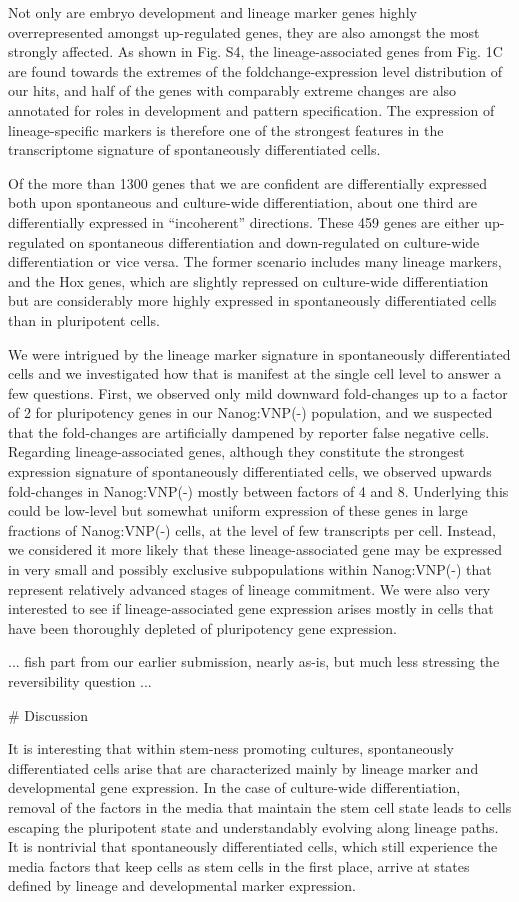 Not only are embryo development and lineage marker genes highly overrepresented amongst up-regulated genes, they are also amongst the most strongly affected. As shown in Fig. S4, the lineage-associated genes from Fig. 1C are found towards the extremes of the foldchange-expression level distribution of our hits, and half of the genes with comparably extreme changes are also annotated for roles in development and pattern specification. The expression of lineage-specific markers is therefore one of the strongest features in the transcriptome signature of spontaneously differentiated cells.

Of the more than 1300 genes that we are confident are differentially expressed both upon spontaneous and culture-wide differentiation, about one third are differentially expressed in ``incoherent'' directions. These 459 genes are either up-regulated on spontaneous differentiation and down-regulated on culture-wide differentiation or vice versa. The former scenario includes many lineage markers, and the Hox genes, which are slightly repressed on culture-wide differentiation but are considerably more highly expressed in spontaneously differentiated cells than in pluripotent cells. 


We were intrigued by the lineage marker signature in spontaneously differentiated cells and we investigated how that is manifest at the single cell level to answer a few questions. First, we observed only mild downward fold-changes up to a factor of 2 for pluripotency genes in our Nanog:VNP(-) population, and we suspected that the fold-changes are artificially dampened by reporter false negative cells.  Regarding lineage-associated genes, although they constitute the  strongest expression signature of spontaneously differentiated cells, we observed upwards fold-changes in Nanog:VNP(-) mostly between factors of 4 and 8. Underlying this could be low-level but somewhat uniform expression of these genes in large fractions of Nanog:VNP(-) cells, at the level of few transcripts per cell. Instead, we considered it more likely that these lineage-associated gene may be expressed in very small and possibly exclusive subpopulations within Nanog:VNP(-) that represent relatively advanced stages of lineage commitment. We were also very interested to see if lineage-associated gene expression arises mostly in cells that have been thoroughly depleted of pluripotency gene expression.

... fish part from our earlier submission, nearly as-is, but much less stressing the reversibility question ...

# Discussion

It is interesting that within stem-ness promoting cultures, spontaneously differentiated cells arise that are characterized mainly by lineage marker and developmental gene expression. In the case of culture-wide differentiation, removal of the factors in the media that maintain the stem cell state leads to cells escaping the pluripotent state and understandably evolving along lineage paths. It is nontrivial that spontaneously differentiated cells, which still experience the media factors that keep cells as stem cells in the first place, arrive at states defined by lineage and developmental marker expression. 